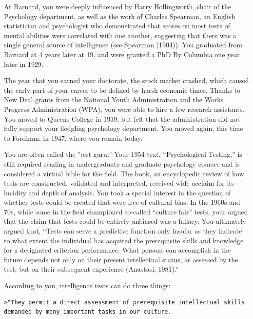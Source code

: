 \begin{refsection}
At Barnard, you were deeply influenced by Harry Hollingworth, chair of the Psychology department, as well as the work of Charles Spearman, an English statistician and psychologist who demonstrated that scores on most tests of mental abilities were correlated with one another, suggesting that there was a single general source of intelligence (see Spearman (1904)). You graduated from Barnard at 4 years later at 19, and were granted a PhD By Columbia one year later in 1929.

The year that you earned your doctorate, the stock market crashed, which caused the early part of your career to be defined by harsh economic times. Thanks to New Deal grants from the National Youth Administration and the Works Progress Administration (WPA), you were able to hire a few research assistants. You moved to Queens College in 1939, but felt that the administration did not fully support your fledgling psychology department. You moved again, this time to Fordham, in 1947, where you remain today.

You are often called the "test guru.`' Your 1954 text, ``Psychological Testing,'' is still required reading in undergraduate and graduate psychology courses and is considered a virtual bible for the field. The book, an encyclopedic review of how tests are constructed, validated and interpreted, received wide acclaim for its lucidity and depth of analysis. You took a special interest in the question of whether tests could be created that were free of cultural bias. In the 1960s and 70s, while some in the field championed so-called ``culture fair'' tests, your argued that the claim that tests could be entirely unbiased was a fallacy. You ultimately argued that, ``Tests can serve a predictive function only insofar as they indicate to what extent the individual has acquired the prerequisite skills and knowledge for a designated criterion performance. What persons can accomplish in the future depends not only on their present intellectual status, as assessed by the test, but on their subsequent experience (Anastasi, 1981).''

According to you, intelligence tests can do three things:

\begin{verbatim}
>"They permit a direct assessment of prerequisite intellectual skills demanded by many important tasks in our culture.
\end{verbatim}

\begin{quote}


\end{quote}
\end{refsection}
